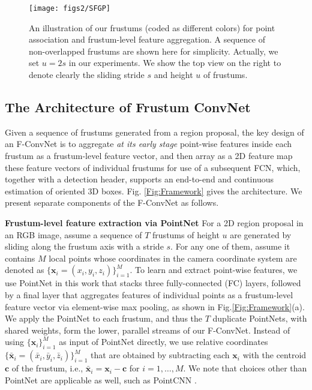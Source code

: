 \documentclass[letterpaper, 10 pt, conference]{ieeeconf}
\begin{document}
\begin{figure}
	\begin{center}
	\texttt{[image: figs2/SFGP]}
	\caption[]{An illustration of our frustums (coded as different colors) for point association and frustum-level feature aggregation. A sequence of non-overlapped frustums are shown here for simplicity. Actually, we set $u=2s$ in our experiments. We show the top view on the right to denote clearly the sliding stride $s$ and height $u$ of frustums.  }
	\label{Fig:SFGP}
	\end{center}
	\vspace{-0.5cm}
\end{figure}
\subsection{The Architecture of Frustum ConvNet}

Given a sequence of frustums generated from a region proposal, the key design of an F-ConvNet is to aggregate \emph{at its early stage} point-wise features inside each frustum as a frustum-level feature vector, and then array as a 2D feature map these feature vectors of individual frustums for use of a subsequent FCN, which, together with a detection header, supports an end-to-end and continuous estimation of oriented 3D boxes. Fig. \ref{Fig:Framework} gives the architecture. We present separate components of the F-ConvNet as follows.

\vspace{0.1cm}
\noindent\textbf{Frustum-level feature extraction via PointNet}
For a 2D region proposal in an RGB image, assume a sequence of $T$ frustums of height $u$ are generated by sliding along the frustum axis with a stride $s$. For any one of them, assume it contains $M$ local points whose coordinates in the camera coordinate system are denoted as $\{ \mathbf{x}_i = (x_i, y_i, z_i) \}_{i=1}^{M}$. To learn and extract point-wise features, we use PointNet\cite{qi2017pointnet} in this work that stacks three fully-connected (FC) layers, followed by a final layer that aggregates features of individual points as a frustum-level feature vector via element-wise max pooling, as shown in Fig.\ref{Fig:Framework}(a).  We apply the PointNet to each frustum, and thus the $T$ duplicate PointNets, with shared weights, form the lower, parallel streams of our F-ConvNet. Instead of using $\{ \mathbf{x}_i \}_{i=1}^{M}$ as input of PointNet directly, we use relative coordinates $\{ \bar{\mathbf{x}}_i = (\bar{x}_i, \bar{y}_i, \bar{z}_i) \}_{i=1}^{M}$ that are obtained by subtracting each $\mathbf{x}_i$ with the centroid $\mathbf{c}$ of the frustum, i.e., $\bar{\mathbf{x}}_i = \mathbf{x}_i - \mathbf{c}$ for $i = 1, \dots, M$. We note that choices other than PointNet are applicable as well, such as PointCNN \cite{li2018pointcnn}.
\end{document}
